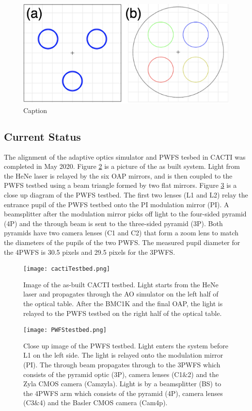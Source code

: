 \begin{figure}
    \centering
    \includegraphics{Chapter Materials/Chapter Five Materials/BeamFootPrint.png}
    \caption{Caption}
    \label{fig:beamfp}
\end{figure}


\subsection{Current Status}

The alignment of the adaptive optics simulator and PWFS tesbed in CACTI was completed in May 2020. Figure \ref{fig:cactiTestbed} is a picture of the as built system. Light from the HeNe laser is relayed by the six OAP mirrors, and is then coupled to the PWFS testbed using a beam triangle formed by two flat mirrors. Figure \ref{fig:PWFStestbed} is a close up diagram of the PWFS testbed. The first two lenses (L1 and L2) relay the entrance pupil of the PWFS testbed onto the PI modulation mirror (PI). A beamsplitter after the modulation mirror picks off light to the four-sided pyramid (4P) and the through beam is sent to the three-sided pyramid (3P). Both pyramids have two camera lenses (C1 and C2) that form a zoom lens to match the diameters of the pupils of the two PWFS. The measured pupil diameter for the 4PWFS is 30.5 pixels and 29.5 pixels for the 3PWFS. 

\begin{figure}
    \centering
    \texttt{[image: cactiTestbed.png]}
    \caption{Image of the as-built CACTI testbed. Light starts from the HeNe laser and propagates through the AO simulator on the left half of the optical table. After the BMC1K and the final OAP, the light is relayed to the PWFS testbed on the right half of the optical table.}
    \label{fig:cactiTestbed}
\end{figure}

\begin{figure}
    \centering
    \texttt{[image: PWFStestbed.png]}
    \caption{Close up image of the PWFS testbed. Light enters the system before L1 on the left side. The light is relayed onto the modulation mirror (PI). The through beam propagates through to the 3PWFS which consists of the pyramid optic (3P), camera lenses (C1$\&$2) and the Zyla CMOS camera (Camzyla). Light is by a beamsplitter (BS) to the 4PWFS arm which consists of the pyramid (4P), camera lenses (C3$\&$4) and the Basler CMOS camera (Cam4p).  }
    \label{fig:PWFStestbed}
\end{figure}


